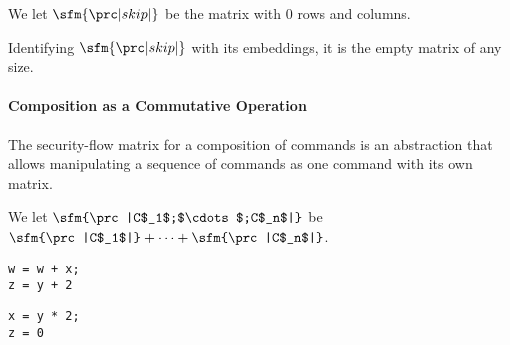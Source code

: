 
\begin{definition}[Skip]
We let $\sfm{\prc|skip|}$ be the matrix with $0$ rows and columns.
\end{definition}

Identifying $\sfm{\prc|skip|}$ with its embeddings, it is the empty matrix of any size.

\paragraph{Composition as a Commutative Operation }

The security-flow matrix for a composition of commands is an abstraction that allows manipulating a sequence of commands as one command with its own matrix.

\begin{definition}[Composition]
We let $\sfm{\prc|C$_1$;$\cdots$;C$_n$|}$
be $\sfm{\prc|C$_1$|} + \cdots + \sfm{\prc|C$_n$|}$.
\end{definition}

\newsavebox\cone
\begin{lrbox}{\cone}
\begin{minipage}{.25\textwidth}
\begin{lstlisting}[numbers=none]
w = w + x;
z = y + 2
\end{lstlisting}
\end{minipage}
\end{lrbox}
\newsavebox\ctwo
\begin{lrbox}{\ctwo}
\begin{minipage}{.25\textwidth}
\begin{lstlisting}[numbers=none]
x = y * 2;
z = 0
\end{lstlisting}
\end{minipage}
\end{lrbox}

